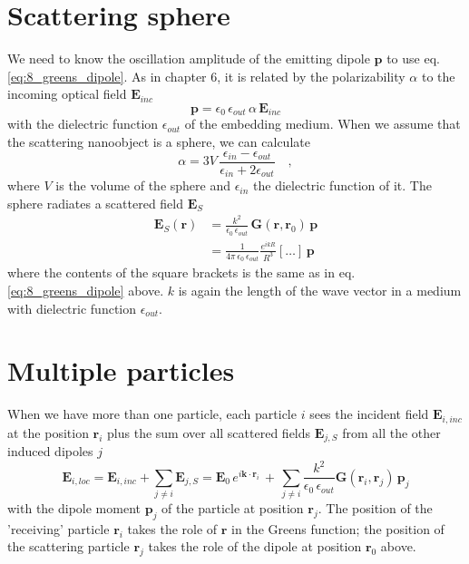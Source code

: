 \section{Scattering sphere}

We need to know the oscillation amplitude of the emitting dipole $\mathbf{p}$ to use eq. \ref{eq:8_greens_dipole}. As in chapter 6, it is related by the  polarizability $\alpha$  to the incoming optical field $\mathbf{E}_{inc}$
\begin{equation}
\mathbf{p} = \epsilon_0 \, \epsilon_{out} \, \alpha \, \mathbf{E}_{inc}
\end{equation}
with the dielectric function $\epsilon_{out}$ of the embedding medium. 
When we assume that the scattering nanoobject is a sphere, we can calculate
\begin{equation}
 \alpha = 3V \, \frac{\epsilon_{in} - \epsilon_{out}}{\epsilon_{in} + 2 \epsilon_{out}} \quad ,
\end{equation}
where $V$ is the volume of the sphere and  $\epsilon_{in}$ the dielectric function of it. 
The sphere  radiates a scattered field $\mathbf{E}_S$
\begin{align}
\mathbf{E}_S(\mathbf{r}) & =  \frac{k^2}{\epsilon_0 \, \epsilon_{out}} \, \mathbf{G}(\mathbf{r}, \mathbf{r}_0) \,  \mathbf{p} \\
 & =  \frac{1}{4 \pi \, \epsilon_0 \, \epsilon_{out}  }  \frac{e^{i k R} }{  R^3 } 
\left[  \dots \right] \, \mathbf{p}
\end{align}
where the contents of the square brackets is the same as in eq.\ref{eq:8_greens_dipole} above. $k$ is again the length of the wave vector in a medium with dielectric function $\epsilon_{out}$.

\section{Multiple particles}

When we have more than one particle, each particle $i$ sees the incident field $\mathbf{E}_{i, inc}$ at the   position $\mathbf{r}_i$ plus the sum over all scattered fields $\mathbf{E}_{j, S}$ from all the other induced dipoles $j$
\begin{equation}
\mathbf{E}_{i, loc} = \mathbf{E}_{i, inc} + \sum_{j \neq i} \mathbf{E}_{j, S}
 = \mathbf{E}_{0} \, e^{i \mathbf{k} \cdot \mathbf{r}_i} \, +  \, 
 \sum_{j \neq i} \frac{k^2}{\epsilon_0 \, \epsilon_{out}} 
 \mathbf{G}(\mathbf{r}_i, \mathbf{r}_j) \,  \mathbf{p}_j  \label{eq:8_elocal}
\end{equation}
with the dipole moment $ \mathbf{p}_j$ of the particle at position $\mathbf{r}_j$. The position of the 'receiving' particle $\mathbf{r}_i$ takes the role of $\mathbf{r}$ in the Greens function; the position of the scattering particle $\mathbf{r}_j$ takes the role of the dipole at position $\mathbf{r}_0$ above.

